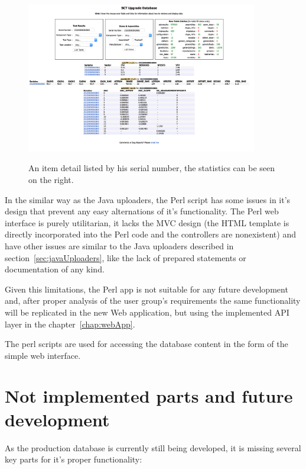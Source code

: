 \begin{figure}[!ht]
	\centering
	\includegraphics[width=0.9\textwidth]{img/perlWebApp2.png}\\	
	\caption{An item detail listed by his serial number, the statistics can be seen on the right.}
\end{figure}

\par In the similar way as the Java uploaders, the Perl script has some issues in it's design that prevent any easy alternations of it's functionality. The Perl web interface is purely utilitarian, it lacks the MVC design (the HTML template is directly incorporated into the Perl code and the controllers are nonexistent) and have other issues are similar to the Java uploaders described in section~\ref{sec:javaUploaders}, like the lack of prepared statements or documentation of any kind.

\par Given this limitations, the Perl app is not suitable for any future development and, after proper analysis of the user group's requirements the same functionality will be replicated in the new Web application, but using the implemented API layer in the chapter~\ref{chap:webApp}.

\par The perl scripts are used for accessing the database content in the form of the simple web interface.


\section{Not implemented parts and future development}
\label{sec:notImplemented}
\par As the production database is currently still being developed, it is missing several key parts for it’s proper functionality:

